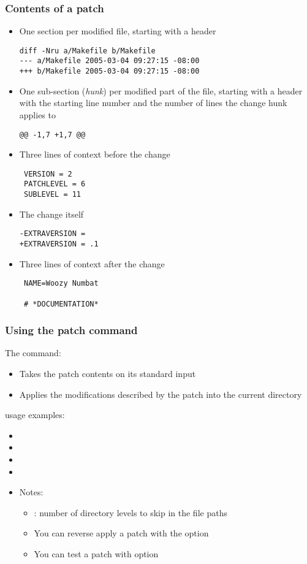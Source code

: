 \begin{frame}[fragile]
  \frametitle{Contents of a patch}
\footnotesize
  \begin{itemize}
  \item One section per modified file, starting with a header
\scriptsize
\begin{verbatim}
diff -Nru a/Makefile b/Makefile
--- a/Makefile 2005-03-04 09:27:15 -08:00
+++ b/Makefile 2005-03-04 09:27:15 -08:00
\end{verbatim}
\small
  \item One sub-section ({\em hunk}) per modified part of the file, starting with
    a header with the starting line number and the number of lines the
    change hunk applies to
\scriptsize
\begin{verbatim}
@@ -1,7 +1,7 @@
\end{verbatim}
\small
  \item Three lines of context before the change
\scriptsize
\begin{verbatim}
 VERSION = 2
 PATCHLEVEL = 6
 SUBLEVEL = 11
\end{verbatim}
\small
  \item The change itself
\scriptsize
\begin{verbatim}
-EXTRAVERSION =
+EXTRAVERSION = .1
\end{verbatim}
\small
    \item Three lines of context after the change
\scriptsize
\begin{verbatim}
 NAME=Woozy Numbat

 # *DOCUMENTATION*
\end{verbatim}
    \end{itemize}
\end{frame}

\begin{frame}
  \frametitle{Using the patch command}
  The  command:
  \begin{itemize}
  \item Takes the patch contents on its standard input
  \item Applies the modifications described by the patch into the
    current directory
  \end{itemize}
   usage examples:
  \begin{itemize}
  \item {}
  \item {}
  \item {}
  \item {}
  \item Notes:
    \begin{itemize}
    \item {}: number of directory levels to skip in the file paths
    \item You can reverse apply a patch with the  option
    \item You can test a patch with  option
    \end{itemize}
  \end{itemize}
\end{frame}

